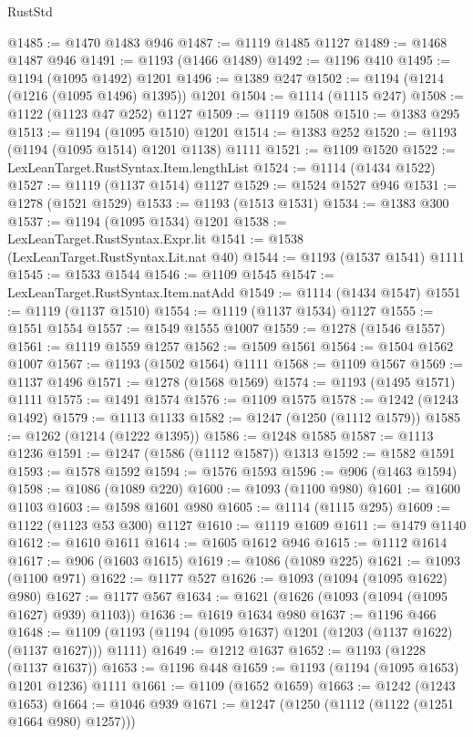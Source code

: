 \begin{lexlean}{RustStd}
\begin{coremodule}
@1485 := @1470 @1483 @946
@1487 := @1119 @1485 @1127
@1489 := @1468 @1487 @946
@1491 := @1193 (@1466 @1489)
@1492 := @1196 @410
@1495 := @1194 (@1095 @1492) @1201
@1496 := @1389 @247
@1502 := @1194 (@1214 (@1216 (@1095 @1496) @1395)) @1201
@1504 := @1114 (@1115 @247)
@1508 := @1122 (@1123 @47 @252) @1127
@1509 := @1119 @1508
@1510 := @1383 @295
@1513 := @1194 (@1095 @1510) @1201
@1514 := @1383 @252
@1520 := @1193 (@1194 (@1095 @1514) @1201 @1138) @1111
@1521 := @1109 @1520
@1522 := LexLeanTarget.RustSyntax.Item.lengthList
@1524 := @1114 (@1434 @1522)
@1527 := @1119 (@1137 @1514) @1127
@1529 := @1524 @1527 @946
@1531 := @1278 (@1521 @1529)
@1533 := @1193 (@1513 @1531)
@1534 := @1383 @300
@1537 := @1194 (@1095 @1534) @1201
@1538 := LexLeanTarget.RustSyntax.Expr.lit
@1541 := @1538 (LexLeanTarget.RustSyntax.Lit.nat @40)
@1544 := @1193 (@1537 @1541) @1111
@1545 := @1533 @1544
@1546 := @1109 @1545
@1547 := LexLeanTarget.RustSyntax.Item.natAdd
@1549 := @1114 (@1434 @1547)
@1551 := @1119 (@1137 @1510)
@1554 := @1119 (@1137 @1534) @1127
@1555 := @1551 @1554
@1557 := @1549 @1555 @1007
@1559 := @1278 (@1546 @1557)
@1561 := @1119 @1559 @1257
@1562 := @1509 @1561
@1564 := @1504 @1562 @1007
@1567 := @1193 (@1502 @1564) @1111
@1568 := @1109 @1567
@1569 := @1137 @1496
@1571 := @1278 (@1568 @1569)
@1574 := @1193 (@1495 @1571) @1111
@1575 := @1491 @1574
@1576 := @1109 @1575
@1578 := @1242 (@1243 @1492)
@1579 := @1113 @1133
@1582 := @1247 (@1250 (@1112 @1579))
@1585 := @1262 (@1214 (@1222 @1395))
@1586 := @1248 @1585
@1587 := @1113 @1236
@1591 := @1247 (@1586 (@1112 @1587)) @1313
@1592 := @1582 @1591
@1593 := @1578 @1592
@1594 := @1576 @1593
@1596 := @906 (@1463 @1594)
@1598 := @1086 (@1089 @220)
@1600 := @1093 (@1100 @980)
@1601 := @1600 @1103
@1603 := @1598 @1601 @980
@1605 := @1114 (@1115 @295)
@1609 := @1122 (@1123 @53 @300) @1127
@1610 := @1119 @1609
@1611 := @1479 @1140
@1612 := @1610 @1611
@1614 := @1605 @1612 @946
@1615 := @1112 @1614
@1617 := @906 (@1603 @1615)
@1619 := @1086 (@1089 @225)
@1621 := @1093 (@1100 @971)
@1622 := @1177 @527
@1626 := @1093 (@1094 (@1095 @1622) @980)
@1627 := @1177 @567
@1634 := @1621 (@1626 (@1093 (@1094 (@1095 @1627) @939) @1103))
@1636 := @1619 @1634 @980
@1637 := @1196 @466
@1648 := @1109 (@1193 (@1194 (@1095 @1637) @1201 (@1203 (@1137 @1622) (@1137 @1627))) @1111)
@1649 := @1212 @1637
@1652 := @1193 (@1228 (@1137 @1637))
@1653 := @1196 @448
@1659 := @1193 (@1194 (@1095 @1653) @1201 @1236) @1111
@1661 := @1109 (@1652 @1659)
@1663 := @1242 (@1243 @1653)
@1664 := @1046 @939
@1671 := @1247 (@1250 (@1112 (@1122 (@1251 @1664 @980) @1257)))

\end{coremodule}
\end{lexlean}
